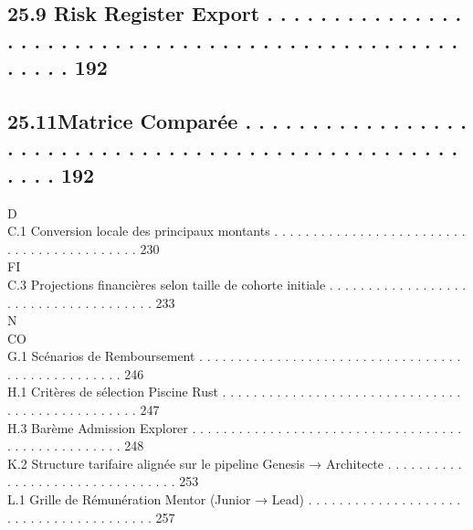 \subsection{25.9 Risk Register Export . . . . . . . . . . . . . . . . . . . . . . . . . . . . . . . . . . . . . . . . . . . . . . . . . . . . . . 192}
\subsection{25.11Matrice Comparée . . . . . . . . . . . . . . . . . . . . . . . . . . . . . . . . . . . . . . . . . . . . . . . . . . . . . . . 192}
\vspace{0.5em}
\vspace{0.5em}
\vspace{0.5em}
\vspace{0.5em}
D\\
C.1 Conversion locale des principaux montants . . . . . . . . . . . . . . . . . . . . . . . . . . . . . . . . . . . . . . . . . . 230\\
\vspace{0.5em}
\vspace{0.5em}
\vspace{0.5em}
\vspace{0.5em}
FI\\
C.3 Projections financières selon taille de cohorte initiale . . . . . . . . . . . . . . . . . . . . . . . . . . . . . . . . . . . . . 233\\
\vspace{0.5em}
N\\
CO\\
G.1 Scénarios de Remboursement        . . . . . . . . . . . . . . . . . . . . . . . . . . . . . . . . . . . . . . . . . . . . . . . . . 246\\
\vspace{0.5em}
H.1 Critères de sélection Piscine Rust . . . . . . . . . . . . . . . . . . . . . . . . . . . . . . . . . . . . . . . . . . . . . . . . 247\\
H.3 Barème Admission Explorer . . . . . . . . . . . . . . . . . . . . . . . . . . . . . . . . . . . . . . . . . . . . . . . . . . 248\\
\vspace{0.5em}
K.2 Structure tarifaire alignée sur le pipeline Genesis → Architecte . . . . . . . . . . . . . . . . . . . . . . . . . . . . . . . . 253\\
\vspace{0.5em}
L.1 Grille de Rémunération Mentor (Junior → Lead) . . . . . . . . . . . . . . . . . . . . . . . . . . . . . . . . . . . . . . . 257\\
